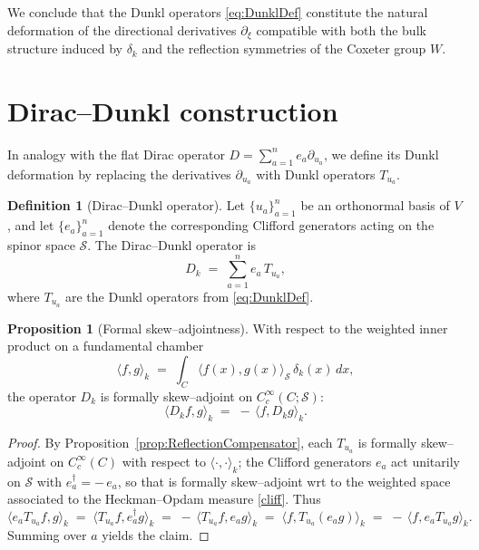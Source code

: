 \documentclass[12pt]{article}
\newcommand{\1}{\mathbbm{1}}
\theoremstyle{definition}
\newtheorem{definition}{Definition}
\newtheorem{proposition}{Proposition}
\begin{document}
\medskip

\noindent
We conclude that the Dunkl operators \eqref{eq:DunklDef} constitute the natural deformation of the directional derivatives $\partial_\xi$ compatible with both the bulk structure induced by $\delta_k$ and the reflection symmetries of the Coxeter group $W$.


\section{Dirac--Dunkl construction}


In analogy with the flat Dirac operator $D = \sum_{a=1}^n e_a \partial_{u_a}$,
we define its Dunkl deformation by replacing the derivatives $\partial_{u_a}$
with Dunkl operators $T_{u_a}$.

\begin{definition}[Dirac--Dunkl operator]\label{def:DiracDunkl}
Let $\{u_a\}_{a=1}^n$ be an orthonormal basis of $V$, and let
$\{e_a\}_{a=1}^n$ denote the corresponding Clifford generators acting
on the spinor space $\mathcal{S}$. The Dirac--Dunkl operator is
\begin{equation}
  D_k \;=\; \sum_{a=1}^n e_a \, T_{u_a},
\end{equation}\label{DDop}
where $T_{u_a}$ are the Dunkl operators from \eqref{eq:DunklDef}.
\end{definition}

\begin{proposition}[Formal skew--adjointness]\label{prop:DkSkew}
With respect to the weighted inner product on a fundamental chamber
\[
  \langle f,g\rangle_{k}
  \;=\;\int_{C}\!\langle f(x),g(x)\rangle_{\mathcal{S}}\,
         \delta_{k}(x)\,dx ,
\]
the operator $D_{k}$ is formally skew--adjoint on
$C_{c}^{\infty}(C;\mathcal{S})$:
\[
  \langle D_{k} f, g\rangle_{k} \;=\; -\,\langle f, D_{k} g\rangle_{k}.
\]
\end{proposition}

\begin{proof}
By Proposition~\ref{prop:ReflectionCompensator}, each $T_{u_{a}}$ is formally skew--adjoint on
$C_{c}^{\infty}(C)$ with respect to $\langle\cdot,\cdot\rangle_{k}$; the Clifford
generators $e_{a}$ act unitarily on $\mathcal{S}$ with
$e_{a}^{\dagger}=-\,e_{a}$, so that is formally skew--adjoint
wrt to the weighted  space associated to the Heckman–Opdam measure \eqref{cliff}. Thus
\[
  \langle e_{a}T_{u_{a}} f, g\rangle_{k}
  \;=\; \langle T_{u_{a}} f, e_{a}^{\dagger} g\rangle_{k}
  \;=\; -\,\langle T_{u_{a}} f, e_{a} g\rangle_{k}
  \;=\; \langle f, T_{u_{a}}(e_{a} g)\rangle_{k}
  \;=\; -\,\langle f, e_{a} T_{u_{a}} g\rangle_{k}.
\]
Summing over $a$ yields the claim.
\end{proof}
\end{document}
